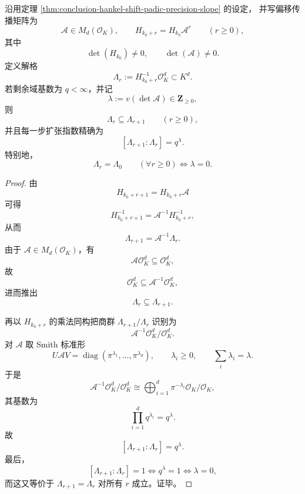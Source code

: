 \begin{theorem}\label{thm:conclusion-shifted-hankel-lattice-expansion-law}
沿用定理 \ref{thm:conclusion-hankel-shift-padic-precision-slope} 的设定，
并写偏移传播矩阵为
\[
\mathcal A\in M_d(\mathcal O_K),\qquad
H_{k_0+r}=H_{k_0}\mathcal A^r\qquad(r\ge 0),
\]
其中
\[
\det(H_{k_0})\neq 0,\qquad \det(\mathcal A)\neq 0.
\]
定义解格
\[
\Lambda_r:=H_{k_0+r}^{-1}\mathcal O_K^d\subset K^d.
\]
若剩余域基数为 \(q<\infty\)，并记
\[
\lambda:=v(\det \mathcal A)\in\mathbf Z_{\ge 0},
\]
则
\[
\Lambda_r\subseteq \Lambda_{r+1}\qquad(r\ge 0),
\]
并且每一步扩张指数精确为
\[
[\Lambda_{r+1}:\Lambda_r]=q^\lambda.
\]
特别地，
\[
\Lambda_r=\Lambda_0\qquad(\forall r\ge 0)
\iff
\lambda=0.
\]
\end{theorem}
\begin{proof}
由
\[
H_{k_0+r+1}=H_{k_0+r}\mathcal A
\]
可得
\[
H_{k_0+r+1}^{-1}=\mathcal A^{-1}H_{k_0+r}^{-1},
\]
从而
\[
\Lambda_{r+1}=\mathcal A^{-1}\Lambda_r.
\]
由于 \(\mathcal A\in M_d(\mathcal O_K)\)，有
\[
\mathcal A\mathcal O_K^d\subseteq \mathcal O_K^d,
\]
故
\[
\mathcal O_K^d\subseteq \mathcal A^{-1}\mathcal O_K^d,
\]
进而推出
\[
\Lambda_r\subseteq \Lambda_{r+1}.
\]

再以 \(H_{k_0+r}\) 的乘法同构把商群 \(\Lambda_{r+1}/\Lambda_r\) 识别为
\[
\mathcal A^{-1}\mathcal O_K^d/\mathcal O_K^d.
\]
对 \(\mathcal A\) 取 Smith 标准形
\[
U\mathcal A V=\operatorname{diag}(\pi^{\lambda_1},\dots,\pi^{\lambda_d}),
\qquad \lambda_i\ge 0,\qquad \sum_i \lambda_i=\lambda.
\]
于是
\[
\mathcal A^{-1}\mathcal O_K^d/\mathcal O_K^d
\cong
\bigoplus_{i=1}^{d}\pi^{-\lambda_i}\mathcal O_K/\mathcal O_K,
\]
其基数为
\[
\prod_{i=1}^{d} q^{\lambda_i}=q^\lambda.
\]
故
\[
[\Lambda_{r+1}:\Lambda_r]=q^\lambda.
\]
最后，
\[
[\Lambda_{r+1}:\Lambda_r]=1
\iff
q^\lambda=1
\iff
\lambda=0,
\]
而这又等价于 \(\Lambda_{r+1}=\Lambda_r\) 对所有 \(r\) 成立。证毕。
\end{proof}

